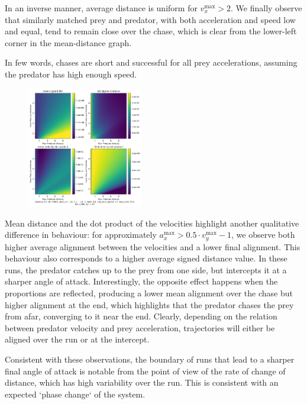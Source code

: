 \documentclass[10pt, twocolumn]{article}
\begin{document}
          In an inverse manner, average distance is uniform for $v_x^{\text{max}}>2$. We finally observe that similarly matched prey and predator, with both acceleration and speed low and equal, tend to remain close over the chase, which is clear from the lower-left corner in the mean-distance graph.

          In few words, chases are short and successful for all prey accelerations, assuming the predator has high enough speed.

          \begin{figure}[H]
            \centering
            \includegraphics[width=0.45\textwidth]{figures/phase_avg_dist_dot.png}
            \label{fig:phaseplot2}
          \end{figure}

          Mean distance and the dot product of the velocities highlight another qualitative difference in behaviour: for approximately $a^{\text{max}}_x > 0.5\cdot v^{\text{max}}_y - 1$, we observe both higher average alignment between the velocities and a lower final alignment. This behaviour also corresponds to a higher average signed distance value. In these runs, the predator catches up to the prey from one side, but intercepts it at a sharper angle of attack. Interestingly, the opposite effect happens when the proportions are reflected, producing a lower mean alignment over the chase but higher alignment at the end, which highlights that the predator chases the prey from afar, converging to it near the end. Clearly, depending on the relation between predator velocity and prey acceleration, trajectories will either be aligned over the run or at the intercept.

          Consistent with these observations, the boundary of runs that lead to a sharper final angle of attack is notable from the point of view of the rate of change of distance, which has high variability over the run. This is consistent with an expected `phase change` of the system.
\end{document}
